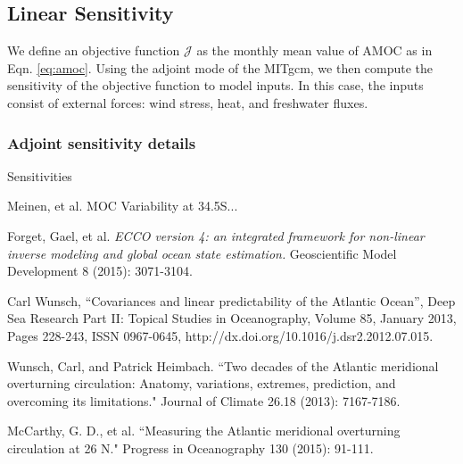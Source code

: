 \documentclass[a4paper,11pt]{article}
\begin{document}
   
  
  \subsection{Linear Sensitivity}
  \label{linearSensitivity}
  
  We define an objective function $\mathcal{J}$ as the monthly mean value of AMOC as in Eqn. \ref{eq:amoc}. Using the adjoint mode of the MITgcm, we then compute the sensitivity of the objective function to model inputs. In this case, the inputs consist of external forces: wind stress, heat, and freshwater fluxes. 
  
   \subsubsection{Adjoint sensitivity details}
   
   Sensitivities 
  
  

\begin{thebibliography}{3}

  Meinen, et al. MOC Variability at 34.5S...
  
  Forget, Gael, et al. \textit{ECCO version 4: an integrated framework for non-linear inverse modeling and global ocean state estimation.} Geoscientific Model Development 8 (2015): 3071-3104.
  
  Carl Wunsch, ``Covariances and linear predictability of the Atlantic Ocean'', Deep Sea Research Part II: Topical Studies in Oceanography, Volume 85, January 2013, Pages 228-243, ISSN 0967-0645, http://dx.doi.org/10.1016/j.dsr2.2012.07.015.
  
  Wunsch, Carl, and Patrick Heimbach. ``Two decades of the Atlantic meridional overturning circulation: Anatomy, variations, extremes, prediction, and overcoming its limitations." Journal of Climate 26.18 (2013): 7167-7186.
  
  McCarthy, G. D., et al. ``Measuring the Atlantic meridional overturning circulation at 26 N." Progress in Oceanography 130 (2015): 91-111.

\end{thebibliography}
\end{document}
